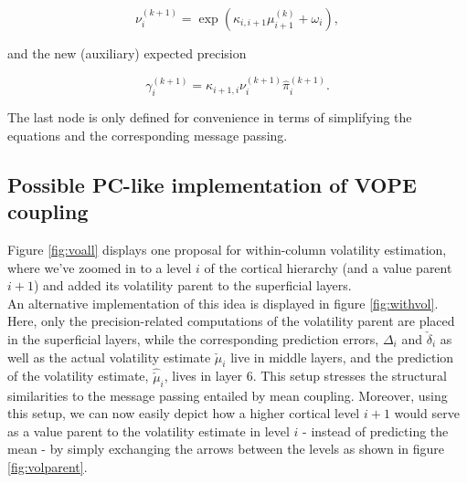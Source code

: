 \begin{equation}
  \nu_i^{(k+1)} = \exp(\kappa_{i,i+1} \mu_{i+1}^{(k)} + \omega_i),
\end{equation}

and the new (auxiliary) expected precision

\begin{equation}
  \gamma_i^{(k+1)} = \kappa_{i+1,i} \nu_i^{(k+1)} \hat{\pi}_i^{(k+1)}.
\end{equation}

The last node is only defined for convenience in terms of simplifying the equations and the corresponding message passing.


\subsection{Possible PC-like implementation of VOPE coupling}


Figure \ref{fig:voall} displays one proposal for within-column volatility estimation, where we've zoomed in to a level $i$ of the cortical hierarchy (and a value parent $i+1$) and added its volatility parent to the superficial layers. \\

An alternative implementation of this idea is displayed in figure \ref{fig:withvol}. Here, only the precision-related computations of the volatility parent are placed in the superficial layers, while the corresponding prediction errors, $\Delta_i$ and $\check{\delta}_i$ as well as the actual volatility estimate $\check{\mu}_i$ live in middle layers, and the prediction of the volatility estimate, $\hat{\check{\mu}}_i$, lives in layer 6. This setup stresses the structural similarities to the message passing entailed by mean coupling. Moreover, using this setup, we can now easily depict how a higher cortical level $i+1$ would serve as a value parent to the volatility estimate in level $i$ - instead of predicting the mean - by simply exchanging the arrows between the levels as shown in figure \ref{fig:volparent}. 


